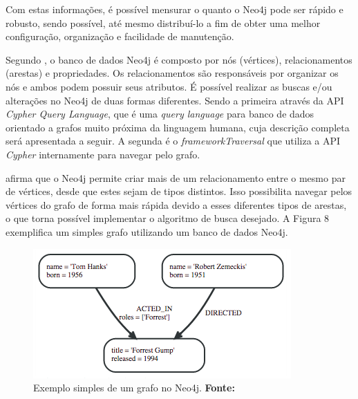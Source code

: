 
\par Com estas informações, é possível mensurar o quanto o Neo4j pode ser rápido e robusto, sendo possível, até mesmo distribuí-lo a fim de obter uma melhor configuração, organização e facilidade de manutenção.

\par Segundo , o banco de dados Neo4j é composto por nós (vértices), relacionamentos (arestas) e propriedades. Os relacionamentos são responsáveis por organizar os nós e ambos podem possuir seus atributos. É possível realizar as buscas e/ou alterações no Neo4j de duas formas diferentes. Sendo a primeira através da API \textit{Cypher Query Language}, que é uma \textit{query language} para banco de dados orientado a grafos muito próxima da linguagem humana, cuja descrição completa será apresentada a seguir. A segunda é o \textit{framework\footnotemark[12] Traversal} que utiliza a API \textit{Cypher} internamente para navegar pelo grafo.



 afirma que o Neo4j permite criar mais de um relacionamento entre o mesmo par de vértices, desde que estes sejam de tipos distintos. Isso possibilita navegar pelos vértices do grafo de forma mais rápida devido a esses diferentes tipos de arestas, o que torna possível implementar o algoritmo de busca desejado. A Figura 8 exemplifica um simples grafo utilizando um banco de dados Neo4j.


\begin{figure}[h!]
	\centerline{\includegraphics[scale=0.8]{./imagens/simple_graph_neo4j.png}}
	\caption[Exemplo simples de um grafo no Neo4j]
	{Exemplo simples de um grafo no Neo4j. \textbf{Fonte:} }
	\label{fig:exemplo1}
\end{figure}

